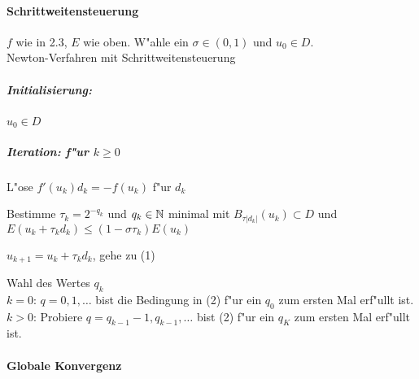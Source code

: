 \documentclass{scrartcl}
\begin{document}
\paragraph{Schrittweitensteuerung}
$f$ wie in 2.3, $E$ wie oben. W"ahle ein $\sigma \in (0,1)$ und $u_0 \in D$. \\
Newton-Verfahren mit Schrittweitensteuerung
\subparagraph*{Initialisierung:} $u_0 \in D$ 
\subparagraph*{Iteration: f"ur $k \geq 0$}
\begin{1aufz}
\item L"ose $f'(u_k) d_k = -f(u_k)$ f"ur $d_k$
\item Bestimme $\tau_k = 2^{-q_k}$ und $q_k \in \mathbb{N}$ minimal mit $B_{\tau \vert d_k \vert}(u_k) \subset D$ und $E(u_k + \tau_k d_k) \leq (1 - \sigma \tau_k) E(u_k)$
\item $u_{k+1} = u_k + \tau_k d_k$, gehe zu (1)
\end{1aufz}
Wahl des Wertes $q_k$ \\
$k=0$:  $q = 0,1, \ldots$ bist die Bedingung in (2) f"ur ein $q_0$ zum ersten Mal erf"ullt ist. \\
$k>0$: Probiere $q = q_{k-1} - 1, q_{k-1}, \ldots$ bist (2) f"ur ein $q_K$ zum ersten Mal erf"ullt ist.

\paragraph{Globale Konvergenz}
\end{document}
